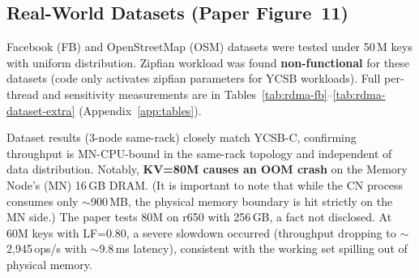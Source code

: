 \documentclass[conference]{IEEEtran}
\begin{document}
\subsection{Real-World Datasets (Paper Figure~11)}\label{sec:repro-datasets}

Facebook (FB) and OpenStreetMap (OSM) datasets were tested under 50\,M keys with uniform distribution. Zipfian workload was found \textbf{non-functional} for these datasets (code only activates zipfian parameters for YCSB workloads). Full per-thread and sensitivity measurements are in Tables~\ref{tab:rdma-fb}--\ref{tab:rdma-dataset-extra} (Appendix~\ref{app:tables}).

Dataset results (3-node same-rack) closely match YCSB-C, confirming throughput is MN-CPU-bound in the same-rack topology and independent of data distribution. Notably, \textbf{KV=80M causes an OOM crash} on the Memory Node's (MN) 16\,GB DRAM. (It is important to note that while the CN process consumes only $\sim$900\,MB, the physical memory boundary is hit strictly on the MN side.) The paper tests 80M on r650 with 256\,GB, a fact not disclosed. At 60M keys with LF=0.80, a severe slowdown occurred (throughput dropping to $\sim$2,945\,ops/s with $\sim$9.8\,ms latency), consistent with the working set spilling out of physical memory.
\end{document}
